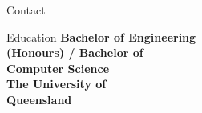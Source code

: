 \documentclass{custom-resume}
\begin{document}
\selectfont  %


\TitleRule
\vspace{-6pt} %

\hspace{-2cm} %
\colorbox{grey0}{
\begin{minipage}[t][23cm]{0.36\textwidth}


  \hspace{1.6cm}  %
  \begin{minipage}[t][23cm]{0.7\textwidth}

    \raggedright

    \vspace{6pt} %


    \begin{section}{Contact}
    \end{section}


    \begin{section}{Education}
      {
        \small
        \textbf{Bachelor of Engineering\\ (Honours) / Bachelor of\\ Computer Science}
      } \\[8pt]

      {
        \large
        \textbf{The University of\\ Queensland} \\[8pt]
      }


\end{section}
\end{minipage}
\end{minipage}}
\end{document}
